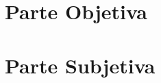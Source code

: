 \documentclass[11pt,twoside,a4paper]{book}
\renewcommand{\chaptermark}[1]{\markboth{\MakeUppercase{#1}}{}}
\begin{document}

\listoffigures            
\listoftables            

\mainmatter

\fancyhead[RE,LO]{\thesection}

\singlespacing              %

\part{Parte Objetiva}


\part{Parte Subjetiva}


\end{document}

